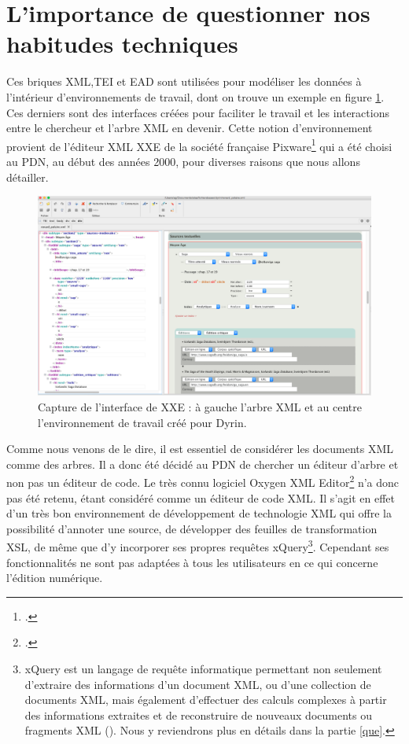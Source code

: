 \documentclass[a4paper,12pt,twoside]{book}
\begin{document}
    \section{L'importance de questionner nos habitudes techniques}
    
    Ces briques \acrshort{XML},\acrshort{TEI} et \acrshort{EAD} sont utilisées pour modéliser les données à l'intérieur d'environnements de travail, dont on trouve un exemple en figure \ref{envi}. Ces derniers sont des interfaces créées pour faciliter le travail et les interactions entre le chercheur et l'arbre XML en devenir. Cette notion d'environnement provient de l'éditeur XML \acrfull{XXE} de la société française Pixware\footcite{pixware} qui a été choisi au \acrshort{PDN}, au début des années 2000, pour diverses raisons que nous allons détailler.
    
    \begin{figure}[H]
    \centering
    \includegraphics[width=12cm]{img/MaX/env_interface.png}
    \caption{Capture de l'interface de XXE : à gauche l'arbre XML et au centre l'environnement de travail créé pour Dyrin.}
    \label{envi}
\end{figure}
    
    
    Comme nous venons de le dire, il est essentiel de considérer les documents \acrshort{XML} comme des arbres. Il a donc été décidé au \acrshort{PDN} de chercher un éditeur d'arbre et non pas un éditeur de code. Le très connu logiciel Oxygen XML Editor\footcite{oxygen} n'a donc pas été retenu, étant considéré comme un éditeur de code \acrshort{XML}. Il s'agit en effet d'un très bon environnement de développement de technologie \acrshort{XML} qui offre la possibilité d'annoter une source, de développer des feuilles de transformation \acrshort{XSL}, de même que d'y incorporer ses propres requêtes xQuery\footnote{xQuery est un langage de requête informatique permettant non seulement d'extraire des informations d'un document XML, ou d'une collection de documents XML, mais également d'effectuer des calculs complexes à partir des informations extraites et de reconstruire de nouveaux documents ou fragments XML (\cite{xquery}). Nous y reviendrons plus en détails dans la partie \ref{que}.}. Cependant ses fonctionnalités ne sont pas adaptées à tous les utilisateurs en ce qui concerne l'édition numérique.
    
\end{document}
